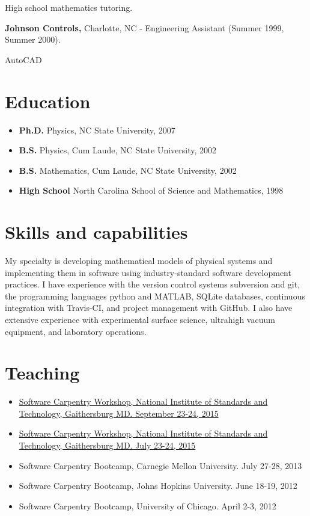 High school mathematics tutoring.

\textbf{Johnson Controls,} Charlotte, NC - Engineering Assistant (Summer
1999, Summer 2000).

AutoCAD

\section{Education}

\begin{itemize}
\item
  \textbf{Ph.D.} Physics, NC State University, 2007
\item
  \textbf{B.S.} Physics, Cum Laude, NC State University, 2002
\item
  \textbf{B.S.} Mathematics, Cum Laude, NC State University, 2002
\item
  \textbf{High School} North Carolina School of Science and Mathematics,
  1998
\end{itemize}

\section{Skills and capabilities}

My specialty is developing mathematical models of physical systems and
implementing them in software using industry-standard software
development practices. I have experience with the version control
systems subversion and git, the programming languages python and MATLAB,
SQLite databases, continuous integration with Travis-CI, and project
management with GitHub. I also have extensive experience with
experimental surface science, ultrahigh vacuum equipment, and laboratory
operations.

\section{Teaching}

\begin{itemize}
\item
  \href{https://pages.nist.gov/2015-09-23-nist/}{Software Carpentry
  Workshop, National Institute of Standards and Technology, Gaithersburg
  MD. September 23-24, 2015}
\item
  \href{https://pages.nist.gov/2015-07-23-nist/}{Software Carpentry
  Workshop, National Institute of Standards and Technology, Gaithersburg
  MD. July 23-24, 2015}
\item
  Software Carpentry Bootcamp, Carnegie Mellon University. July 27-28,
  2013
\item
  Software Carpentry Bootcamp, Johns Hopkins University. June 18-19,
  2012
\item
  Software Carpentry Bootcamp, University of Chicago. April 2-3, 2012
\end{itemize}

